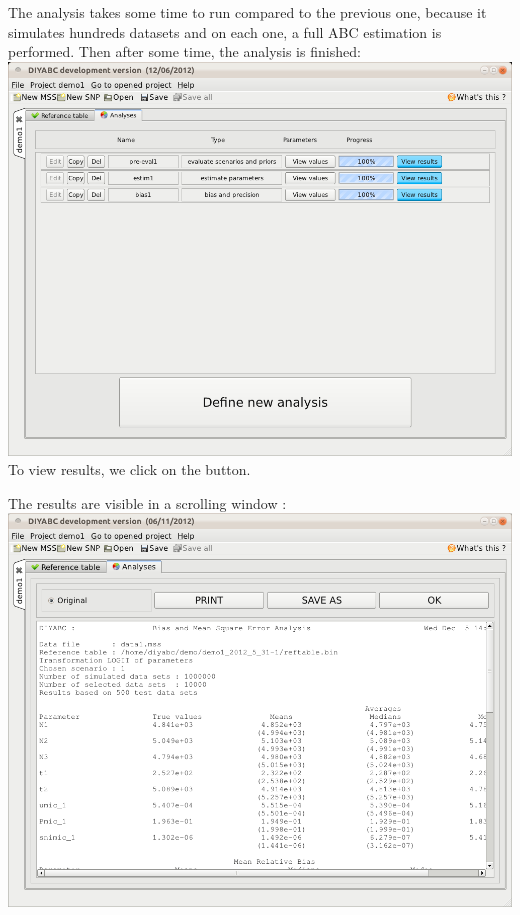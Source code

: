 The analysis takes some time to run compared to the previous one,
because it simulates hundreds datasets and on each one, a full ABC
estimation is performed. Then after some time, the analysis is finished:
\\


\includegraphics[scale=0.35]{gui_pictures/Capture-DIYABC-51} \\


To view results, we click on the  button.

\newpage{}

The results are visible in a scrolling window :\\


\includegraphics[scale=0.32]{gui_pictures/Capture-DIYABC-52a} \\


